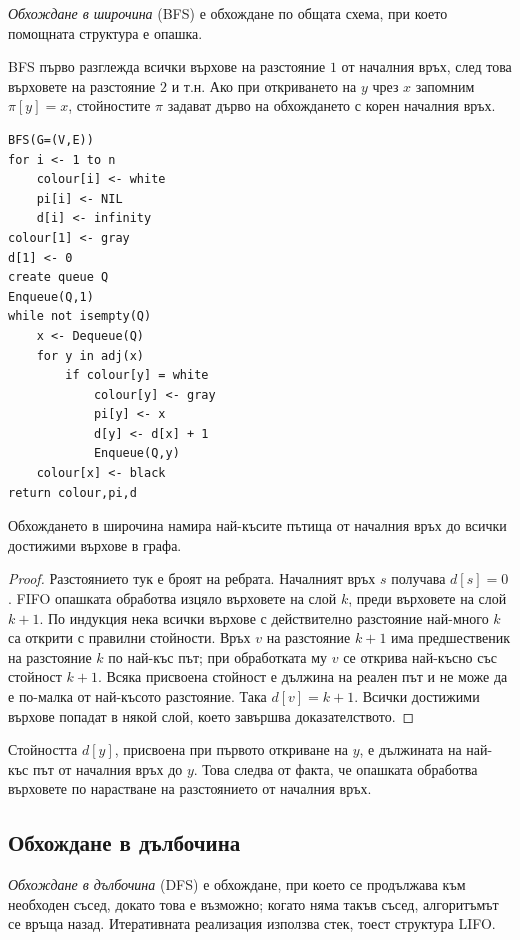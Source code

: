 \begin{keydefn}
\emph{Обхождане в широчина} (BFS) е обхождане по общата схема, при което помощната структура е опашка.
\end{keydefn}

BFS първо разглежда всички върхове на разстояние $1$ от началния връх, след това върховете на разстояние $2$ и т.н. Ако при откриването на $y$ чрез $x$ запомним $\pi[y]=x$, стойностите $\pi$ задават дърво на обхождането с корен началния връх.

\begin{verbatim}
BFS(G=(V,E))
for i <- 1 to n
    colour[i] <- white
    pi[i] <- NIL
    d[i] <- infinity
colour[1] <- gray
d[1] <- 0
create queue Q
Enqueue(Q,1)
while not isempty(Q)
    x <- Dequeue(Q)
    for y in adj(x)
        if colour[y] = white
            colour[y] <- gray
            pi[y] <- x
            d[y] <- d[x] + 1
            Enqueue(Q,y)
    colour[x] <- black
return colour,pi,d
\end{verbatim}

\begin{keythm}
Обхождането в широчина намира най-късите пътища от началния връх до всички достижими върхове в графа.
\end{keythm}

\begin{proof}
Разстоянието тук е броят на ребрата. Началният връх $s$ получава $d[s]=0$. FIFO опашката обработва изцяло върховете на слой $k$, преди върховете на слой $k+1$. По индукция нека всички върхове с действително разстояние най-много $k$ са открити с правилни стойности. Връх $v$ на разстояние $k+1$ има предшественик на разстояние $k$ по най-къс път; при обработката му $v$ се открива най-късно със стойност $k+1$. Всяка присвоена стойност е дължина на реален път и не може да е по-малка от най-късото разстояние. Така $d[v]=k+1$. Всички достижими върхове попадат в някой слой, което завършва доказателството.
\end{proof}

Стойността $d[y]$, присвоена при първото откриване на $y$, е дължината на най-къс път от началния връх до $y$. Това следва от факта, че опашката обработва върховете по нарастване на разстоянието от началния връх.

\subsection{Обхождане в дълбочина}\label{s:3.5.4}

\begin{keydefn}
\emph{Обхождане в дълбочина} (DFS) е обхождане, при което се продължава към необходен съсед, докато това е възможно; когато няма такъв съсед, алгоритъмът се връща назад. Итеративната реализация използва стек, тоест структура LIFO.
\end{keydefn}

